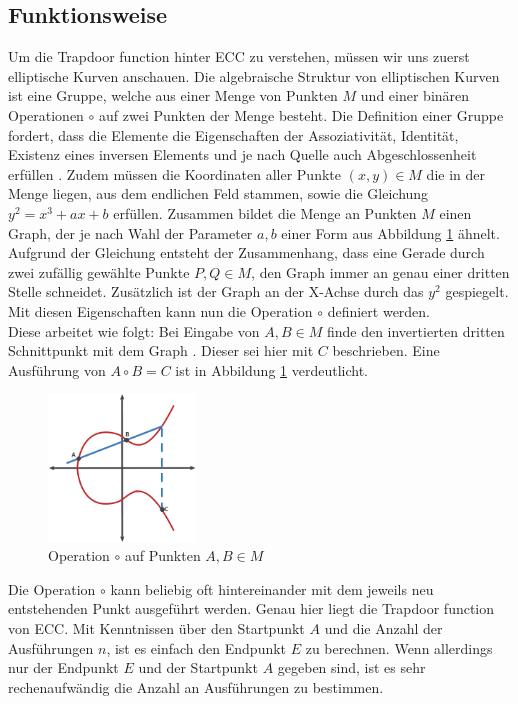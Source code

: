\documentclass[
	fontsize=11pt,
	headings=small,
	parskip=half,           %
	bibliography=totoc,
	numbers=noenddot,       %
	open=any,               %
]{scrreprt}
\begin{document}
\subsection{Funktionsweise}
Um die Trapdoor function hinter ECC zu verstehen, müssen wir uns zuerst elliptische Kurven anschauen. Die algebraische Struktur von elliptischen Kurven ist eine Gruppe, welche aus einer Menge von Punkten $M$ und einer binären Operationen $\circ$ auf zwei Punkten der Menge besteht. Die Definition einer Gruppe fordert, dass die Elemente die Eigenschaften der Assoziativität, Identität, Existenz eines inversen Elements und je nach Quelle auch Abgeschlossenheit erfüllen \cite{ecc-aradi2016einfuhrung, ecc-bogopolskij2008introduction}. Zudem müssen die Koordinaten aller Punkte $(x,y) \in M$ die in der Menge liegen, aus dem endlichen Feld stammen, sowie die Gleichung    $y^2 = x^3+ax+b$ erfüllen. Zusammen bildet die Menge an Punkten $M$ einen Graph, der je nach Wahl der Parameter $a,b$ einer Form aus Abbildung \ref{fig:ecc_2} ähnelt. Aufgrund der Gleichung entsteht der Zusammenhang, dass eine Gerade durch zwei zufällig gewählte Punkte $P,Q \in M$, den Graph immer an genau einer dritten Stelle schneidet. Zusätzlich ist der Graph an der X-Achse durch das $y^2$ gespiegelt. Mit diesen Eigenschaften kann nun die Operation $\circ$ definiert werden.\\
Diese arbeitet wie folgt: Bei Eingabe von $A,B \in M$ finde den invertierten dritten Schnittpunkt mit dem Graph \cite{ecc-Goyal2021Empirical}. Dieser sei hier mit $C$ beschrieben. Eine Ausführung von $A \circ B = C$ ist in Abbildung \ref{fig:ecc_2} verdeutlicht.

\begin{figure}[h]
    \centering
    \includegraphics[width=0.35\textwidth]{ecc_2.png}
    \caption{Operation $\circ$ auf Punkten $A,B \in M$ \cite{ecc-cloud2013elliptic}}
    \label{fig:ecc_2}
\end{figure}

Die Operation $\circ$ kann beliebig oft hintereinander mit dem jeweils neu entstehenden Punkt ausgeführt werden. Genau hier liegt die Trapdoor function von ECC. Mit Kenntnissen über den Startpunkt $A$ und die Anzahl der Ausführungen $n$, ist es einfach den Endpunkt $E$ zu berechnen. Wenn allerdings nur der Endpunkt $E$ und der Startpunkt $A$ gegeben sind, ist es sehr rechenaufwändig die Anzahl an Ausführungen zu bestimmen.
\end{document}
